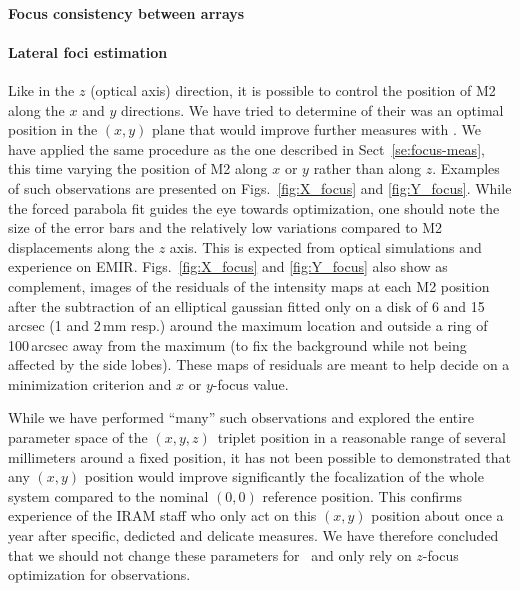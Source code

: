 \paragraph{Focus consistency between arrays}


\paragraph{Lateral foci estimation}
\label{sec:focus_X_Y}

Like in the $z$ (optical axis) direction, it is possible to control the position
of M2 along the $x$ and $y$ directions. We have tried to determine of their was
an optimal position in the $(x,y)$ plane that would improve further measures
with \nika. We have applied the same procedure as the one described in
Sect~\ref{se:focus-meas}, this time varying the position of M2 along $x$ or $y$
rather than along $z$. Examples of such observations are presented on
Figs.~\ref{fig:X_focus} and \ref{fig:Y_focus}. While the forced parabola fit
guides the eye towards optimization, one should note the size of the error bars
and the relatively low variations compared to M2 displacements along the $z$
axis. This is expected from optical simulations and experience on
EMIR. Figs.~\ref{fig:X_focus} and \ref{fig:Y_focus} also show as complement,
images of the residuals of the intensity maps at each M2 position after the
subtraction of an elliptical gaussian fitted only on a disk of 6 and 15\,arcsec
(1 and 2\,mm resp.) around the maximum location and outside a ring of 100\,arcsec
away from the maximum (to fix the background while not being affected by the
side lobes). These maps of residuals are meant to help decide on a minimization
criterion and $x$ or $y$-focus value.

While we have performed ``many'' such observations and explored the entire
parameter space of the $(x,y,z)$~triplet position in a reasonable range of
several millimeters around a fixed position, it has not been possible to
demonstrated that any $(x,y)$ position would improve significantly the
focalization of the whole system compared to the nominal $(0,0)$ reference
position. This confirms experience of the IRAM staff who only act on this
$(x,y)$ position about once a year after specific, dedicted and delicate
measures. We have therefore concluded that we should not change these parameters
for \nika\ and only rely on $z$-focus optimization for observations.

